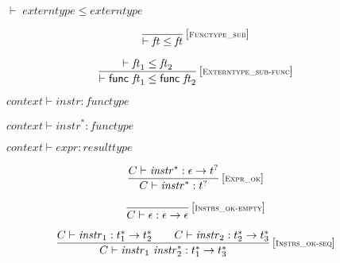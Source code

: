 \documentclass{article}
\begin{document}
$\boxed{{ \vdash }\;{\mathit{externtype}} \leq {\mathit{externtype}}}$

\vspace{1ex}

$$
\begin{array}{@{}c@{}}\displaystyle
	\frac{
	}{
		{ \vdash }\;{\mathit{ft}} \leq {\mathit{ft}}
	} \, {[\textsc{\scriptsize Functype\_sub}]}
	\qquad
\end{array}
$$

$$
\begin{array}{@{}c@{}}\displaystyle
	\frac{
		{ \vdash }\;{\mathit{ft}}_1 \leq {\mathit{ft}}_2
	}{
		{ \vdash }\;\mathsf{func}~{\mathit{ft}}_1 \leq \mathsf{func}~{\mathit{ft}}_2
	} \, {[\textsc{\scriptsize Externtype\_sub{-}func}]}
	\qquad
\end{array}
$$

\vspace{1ex}

$\boxed{{\mathit{context}} \vdash {\mathit{instr}} : {\mathit{functype}}}$

$\boxed{{\mathit{context}} \vdash {{\mathit{instr}}^\ast} : {\mathit{functype}}}$

$\boxed{{\mathit{context}} \vdash {\mathit{expr}} : {\mathit{resulttype}}}$

\vspace{1ex}

$$
\begin{array}{@{}c@{}}\displaystyle
	\frac{
		C \vdash {{\mathit{instr}}^\ast} : \epsilon \rightarrow {t^?}
	}{
		C \vdash {{\mathit{instr}}^\ast} : {t^?}
	} \, {[\textsc{\scriptsize Expr\_ok}]}
	\qquad
\end{array}
$$

\vspace{1ex}

$$
\begin{array}{@{}c@{}}\displaystyle
	\frac{
	}{
		C \vdash \epsilon : \epsilon \rightarrow \epsilon
	} \, {[\textsc{\scriptsize Instrs\_ok{-}empty}]}
	\qquad
\end{array}
$$

$$
\begin{array}{@{}c@{}}\displaystyle
	\frac{
		C \vdash {\mathit{instr}}_1 : {t_1^\ast} \rightarrow {t_2^\ast}
		\qquad
		C \vdash {\mathit{instr}}_2 : {t_2^\ast} \rightarrow {t_3^\ast}
	}{
		C \vdash {\mathit{instr}}_1~{{\mathit{instr}}_2^\ast} : {t_1^\ast} \rightarrow {t_3^\ast}
	} \, {[\textsc{\scriptsize Instrs\_ok{-}seq}]}
	\qquad
\end{array}
$$
\end{document}
